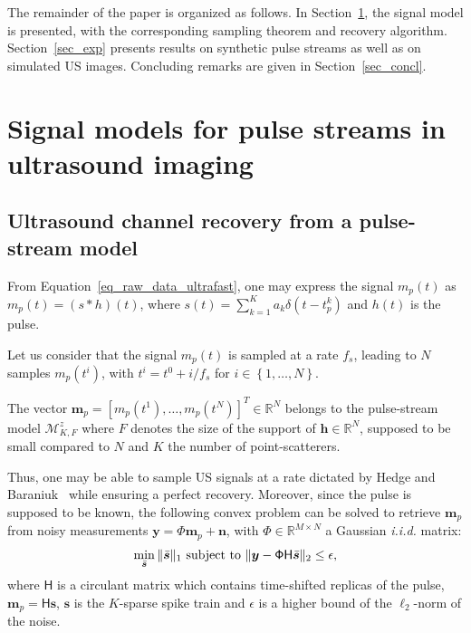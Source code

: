 \documentclass[journal]{IEEEtran}
\newcommand{\vect}[1]{\bm{#1}}
\newcommand{\mat}[1]{\mathsf{#1}}
\newcommand{\ser}[2]{#1^{#2}}
\theoremstyle{definition}
\begin{document}
The remainder of the paper is organized as follows. In Section~\ref{sec_pulsestreams_US}, the signal model is presented, with the corresponding sampling theorem and recovery algorithm. Section~\ref{sec_exp} presents results on synthetic pulse streams as well as on simulated US images. Concluding remarks are given in Section~\ref{sec_concl}.

\section{Signal models for pulse streams in ultrasound imaging}
\label{sec_pulsestreams_US}
\subsection{Ultrasound channel recovery from a pulse-stream model}
\label{subsec_US_pulsestream}
From Equation~\eqref{eq_raw_data_ultrafast}, one may express the signal $m_p\left(t\right)$ as $m_p\left(t\right) = \left(s \ast h\right)\left(t\right)$, where $s \left(t\right) = \sum \limits_{k=1}^{K} a_k \delta\left(t - \ser{t_p}{k}\right)$ and $h\left(t\right)$ is the pulse. 

Let us consider that the signal $m_p \left(t\right)$ is sampled at a rate $f_s$, leading to $N$ samples $ m_p \left(\ser{t}{i}\right)$, with $\ser{t}{i}= \ser{t}{0} + i/f_s$ for $i \in \left\lbrace 1,\dots,N \right\rbrace$.

The vector $\vect{m}_p = \left[m_p\left(\ser{t}{1}\right),\dots,m_p\left(\ser{t}{N}\right)\right]^T \in \mathbb{R}^N$ belongs to the pulse-stream model $\mathcal{M}^z_{K,F}$ where $F$ denotes the size of the support of $\vect{h} \in \mathbb{R}^N$, supposed to be small compared to $N$ and $K$ the number of point-scatterers.

Thus, one may be able to sample US signals at a rate dictated by Hedge and Baraniuk~\cite{Hedge_TSP_2011} while ensuring a perfect recovery. Moreover, since the pulse is supposed to be known, the following convex problem can be solved to retrieve $\vect{m}_p$ from noisy measurements $\vect{y} = \mathsf{\Phi} \vect{m}_p + \vect{n}$, with $\mathsf{\Phi} \in \mathbb{R}^{M \times N}$ a Gaussian \textit{i.i.d.} matrix:
\begin{equation}
\label{eq_l1_BPDN}
\min_{\bar{\vect{s}}}\|\bar{\vect{s}}\|_{1}
\textnormal{ subject to }\| \bm{y}-\mat{\Phi H}\bar{\vect{s}}\|_{2}\leq\epsilon,
\end{equation}
where $\mat{H}$ is a circulant matrix which contains time-shifted replicas of the pulse, $\vect{m}_p = \mat{H} \vect{s}$, $\vect{s}$ is the $K$-sparse spike train and $\epsilon$ is a higher bound of the $\ell_2$-norm of the noise.
\end{document}
